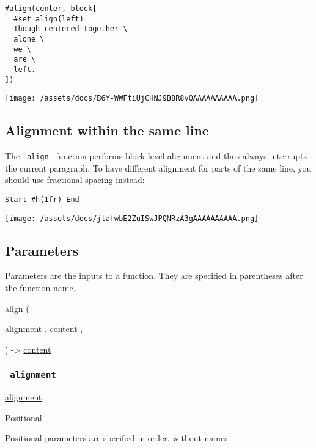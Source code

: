 \begin{verbatim}
#align(center, block[
  #set align(left)
  Though centered together \
  alone \
  we \
  are \
  left.
])
\end{verbatim}

\texttt{[image: /assets/docs/B6Y-WWFtiUjCHNJ9B8R8vQAAAAAAAAAA.png]}

\subsection{Alignment within the same
line}\label{alignment-within-the-same-line}

The \texttt{\ align\ } function performs block-level alignment and thus
always interrupts the current paragraph. To have different alignment for
parts of the same line, you should use
\href{/docs/reference/layout/h/}{fractional spacing} instead:

\begin{verbatim}
Start #h(1fr) End
\end{verbatim}

\texttt{[image: /assets/docs/jlafwbE2ZuISwJPQNRzA3gAAAAAAAAAA.png]}

\subsection{\texorpdfstring{{ Parameters
}}{ Parameters }}\label{parameters}

\label{parameters-tooltip}
Parameters are the inputs to a function. They are specified in
parentheses after the function name.

{ align } (

{ \hyperref[parameters-alignment]{}
\href{/docs/reference/layout/alignment/}{alignment} , } {
\href{/docs/reference/foundations/content/}{content} , }

) -\textgreater{} \href{/docs/reference/foundations/content/}{content}

\subsubsection{\texorpdfstring{\texttt{\ alignment\ }}{ alignment }}\label{parameters-alignment}

\href{/docs/reference/layout/alignment/}{alignment}

{{ Positional }}

\phantomsection\label{parameters-alignment-positional-tooltip}
Positional parameters are specified in order, without names.

